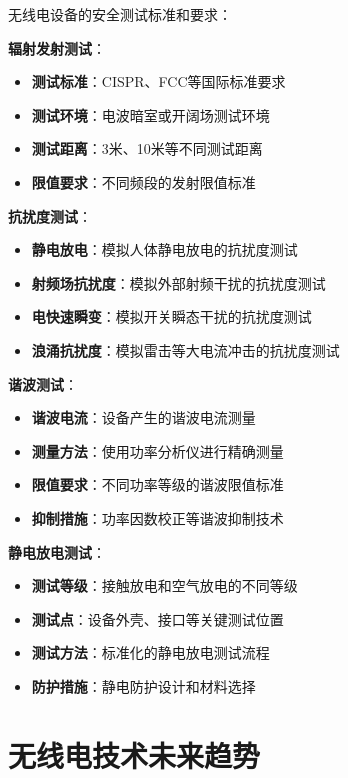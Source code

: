 \documentclass[12pt,UTF8]{ctexbook}
\begin{document}
无线电设备的安全测试标准和要求：

\textbf{辐射发射测试}：
\begin{itemize}[leftmargin=3.5em]
    \item \textbf{测试标准}：CISPR、FCC等国际标准要求
    \item \textbf{测试环境}：电波暗室或开阔场测试环境
    \item \textbf{测试距离}：3米、10米等不同测试距离
    \item \textbf{限值要求}：不同频段的发射限值标准
\end{itemize}

\textbf{抗扰度测试}：
\begin{itemize}[leftmargin=3.5em]
    \item \textbf{静电放电}：模拟人体静电放电的抗扰度测试
    \item \textbf{射频场抗扰度}：模拟外部射频干扰的抗扰度测试
    \item \textbf{电快速瞬变}：模拟开关瞬态干扰的抗扰度测试
    \item \textbf{浪涌抗扰度}：模拟雷击等大电流冲击的抗扰度测试
\end{itemize}

\textbf{谐波测试}：
\begin{itemize}[leftmargin=3.5em]
    \item \textbf{谐波电流}：设备产生的谐波电流测量
    \item \textbf{测量方法}：使用功率分析仪进行精确测量
    \item \textbf{限值要求}：不同功率等级的谐波限值标准
    \item \textbf{抑制措施}：功率因数校正等谐波抑制技术
\end{itemize}

\textbf{静电放电测试}：
\begin{itemize}[leftmargin=3.5em]
    \item \textbf{测试等级}：接触放电和空气放电的不同等级
    \item \textbf{测试点}：设备外壳、接口等关键测试位置
    \item \textbf{测试方法}：标准化的静电放电测试流程
    \item \textbf{防护措施}：静电防护设计和材料选择
\end{itemize}

\section{无线电技术未来趋势}
\end{document}
